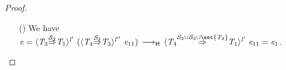 \documentclass[9pt]{extarticle}
\newcommand{\ottnt}[1]{\mathit{#1}}
\begin{document}
{\begin{lemma}
\begin{proof}
{\begin{itemize}
      In the original derivation with $\ottnt{e_{{\mathrm{1}}}}$, the only step we can take is $ \langle  \ottnt{T_{{\mathrm{1}}}}  \mathord{ \overset{ \mathcal{S}_{{\mathrm{1}}} }{\Rightarrow} }  \ottnt{T_{{\mathrm{2}}}}  \rangle^{ \ottnt{l} } ~   (  \langle  \ottnt{T_{{\mathrm{3}}}}  \mathord{ \overset{ \mathcal{S}_{{\mathrm{2}}} }{\Rightarrow} }  \ottnt{T_{{\mathrm{1}}}}  \rangle^{ \ottnt{l'} } ~  \ottnt{e_{{\mathrm{12}}}}  )   \,  \longrightarrow _{  \mathsf{H}  }  \,  \langle  \ottnt{T_{{\mathrm{3}}}}  \mathord{ \overset{   \mathcal{S}_{{\mathrm{1}}}  \cup  \mathcal{S}_{{\mathrm{2}}}   \cup   \set{  \ottnt{T_{{\mathrm{1}}}}  }   }{\Rightarrow} }  \ottnt{T_{{\mathrm{2}}}}  \rangle^{ \ottnt{l} } ~  \ottnt{e_{{\mathrm{12}}}} $
      . We find a new derivation with $\ottnt{e}$ as
      follows:
      \[ \begin{array}{rlr}
        &  \langle  \ottnt{T_{{\mathrm{1}}}}  \mathord{ \overset{ \mathcal{S}_{{\mathrm{1}}} }{\Rightarrow} }  \ottnt{T_{{\mathrm{2}}}}  \rangle^{ \ottnt{l} } ~   (  \langle  \ottnt{T_{{\mathrm{3}}}}  \mathord{ \overset{ \mathcal{S}_{{\mathrm{2}}} }{\Rightarrow} }  \ottnt{T_{{\mathrm{1}}}}  \rangle^{ \ottnt{l'} } ~  \ottnt{e_{{\mathrm{11}}}}  )   & \E{CastMerge} \\
         \longrightarrow _{  \mathsf{H}  } &  \langle  \ottnt{T_{{\mathrm{3}}}}  \mathord{ \overset{   \mathcal{S}_{{\mathrm{1}}}  \cup  \mathcal{S}_{{\mathrm{2}}}   \cup   \set{  \ottnt{T_{{\mathrm{1}}}}  }   }{\Rightarrow} }  \ottnt{T_{{\mathrm{2}}}}  \rangle^{ \ottnt{l} } ~  \ottnt{e_{{\mathrm{11}}}}  & \E{CastInner} \text{~since $\ottnt{e_{{\mathrm{11}}}}  \neq   \langle  \ottnt{T_{{\mathrm{4}}}}  \mathord{ \overset{\bullet}{\Rightarrow} }  \ottnt{T_{{\mathrm{3}}}}  \rangle^{ \ottnt{l''} } ~  \ottnt{e''_{{\mathrm{2}}}} $} \\
         \longrightarrow _{  \mathsf{H}  } &  \langle  \ottnt{T_{{\mathrm{3}}}}  \mathord{ \overset{   \mathcal{S}_{{\mathrm{1}}}  \cup  \mathcal{S}_{{\mathrm{2}}}   \cup   \set{  \ottnt{T_{{\mathrm{1}}}}  }   }{\Rightarrow} }  \ottnt{T_{{\mathrm{2}}}}  \rangle^{ \ottnt{l} } ~  \ottnt{e_{{\mathrm{12}}}}  & \text{(assumption)}
      \end{array} \]

    \item[(\E{CastMerge})] We have $\ottnt{e} =  \langle  \ottnt{T_{{\mathrm{3}}}}  \mathord{ \overset{ \mathcal{S}_{{\mathrm{2}}} }{\Rightarrow} }  \ottnt{T_{{\mathrm{1}}}}  \rangle^{ \ottnt{l'} } ~   (  \langle  \ottnt{T_{{\mathrm{4}}}}  \mathord{ \overset{ \mathcal{S}_{{\mathrm{3}}} }{\Rightarrow} }  \ottnt{T_{{\mathrm{3}}}}  \rangle^{ \ottnt{l''} } ~  \ottnt{e_{{\mathrm{11}}}}  )   \,  \longrightarrow _{  \mathsf{H}  }  \,  \langle  \ottnt{T_{{\mathrm{4}}}}  \mathord{ \overset{   \mathcal{S}_{{\mathrm{2}}}  \cup  \mathcal{S}_{{\mathrm{3}}}   \cup   \set{  \ottnt{T_{{\mathrm{3}}}}  }   }{\Rightarrow} }  \ottnt{T_{{\mathrm{1}}}}  \rangle^{ \ottnt{l'} } ~  \ottnt{e_{{\mathrm{11}}}}  = \ottnt{e_{{\mathrm{1}}}}$.


\end{itemize}}
\end{proof}
\end{lemma}}
\end{document}

